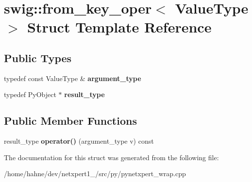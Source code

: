 \hypertarget{structswig_1_1from__key__oper}{}\section{swig\+:\+:from\+\_\+key\+\_\+oper$<$ Value\+Type $>$ Struct Template Reference}
\label{structswig_1_1from__key__oper}
\subsection*{Public Types}
\begin{DoxyCompactItemize}
\item 
typedef const Value\+Type \& {\bfseries argument\+\_\+type}\hypertarget{structswig_1_1from__key__oper_a215e6c79db4b71c9aa22b77c4e420669}{}\label{structswig_1_1from__key__oper_a215e6c79db4b71c9aa22b77c4e420669}

\item 
typedef Py\+Object $\ast$ {\bfseries result\+\_\+type}\hypertarget{structswig_1_1from__key__oper_ae5b8af422665141a9736faf34791725b}{}\label{structswig_1_1from__key__oper_ae5b8af422665141a9736faf34791725b}

\end{DoxyCompactItemize}
\subsection*{Public Member Functions}
\begin{DoxyCompactItemize}
\item 
result\+\_\+type {\bfseries operator()} (argument\+\_\+type v) const \hypertarget{structswig_1_1from__key__oper_af817d37f308de676ccf44069165deb2e}{}\label{structswig_1_1from__key__oper_af817d37f308de676ccf44069165deb2e}

\end{DoxyCompactItemize}


The documentation for this struct was generated from the following file\+:\begin{DoxyCompactItemize}
\item 
/home/hahne/dev/netxpert1\+\_/src/py/pynetxpert\+\_\+wrap.\+cpp\end{DoxyCompactItemize}
